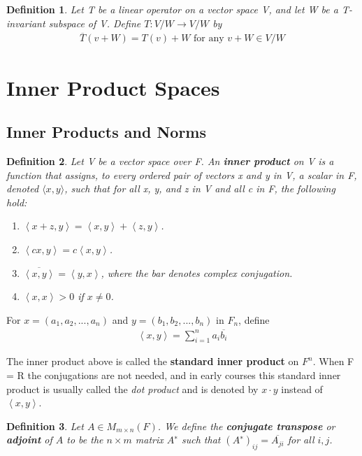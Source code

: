 \documentclass{article}
\newcommand{\bd}[1]{\textbf{#1}}
\newcommand{\ip}[1]{\left\langle {#1}\right\rangle} %
\theoremstyle{plain}
\newtheorem*{definition1}{Definition}
\theoremstyle{plain} %
\begin{document}
\begin{definition1}
  Let T be a linear operator on a vector space V, and let W be a T-invariant subspace of V. Define $T: V/W \to V/W$ by
  \begin{align*}
    \overline{T}(v+W) = T(v)+W\text{ for any }v+W\in V/W
  \end{align*}
\end{definition1}

\section {Inner Product Spaces}

\subsection {Inner Products and Norms}

\begin{definition1}
  Let V be a vector space over F. An \bd{inner product} on V is a function that assigns, to every ordered pair of vectors x and y in V, a scalar in F, denoted $\langle x, y\rangle$, such that for all x, y, and z in V and all c in F, the following hold:
  \begin{enumerate}[label=(\alph*)]
    \item $\ip{x+z, y} = \ip{x, y}+\ip {z, y}$.
    \item $\ip{cx, y}=c\ip{x, y}$.
    \item $\overline{\ip{x, y}}=\ip{y, x}$, where the bar denotes complex conjugation.
    \item $\ip{x, x}>0$ if $x\neq 0$.
  \end{enumerate}
\end{definition1}

For $x = (a_1, a_2,...,a_n)$ and $y = (b_1, b_2,...,b_n)$ in $F_n$, define
\begin{align*}
  \ip{x, y}=\sum_{i=1}^n a_i\overline{b_i}
\end{align*}

The inner product above is called the \bd{standard inner product} on $F^n$. When F = R the conjugations are not needed, and in early courses this standard inner product is usually called the \textit{dot product} and is denoted
by $x\cdot y$ instead of $\ip{x, y}$.

\begin{definition1}
  Let $A \in M_{m\times n}(F)$. We define the \bd{conjugate transpose} or \bd{adjoint} of $A$ to be the $n \times m$ matrix $A^∗$ such that $(A^∗)_{ij} = \overline{A_{ji}}$ for all $i, j$.
\end{definition1}
\end{document}
